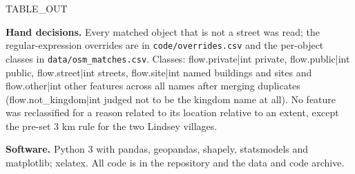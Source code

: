 \documentclass[11pt,a4paper]{article}
\begin{document}
{{TABLE_OUT}}

\textbf{Hand decisions.} Every matched object that is not a street was read; the regular-expression overrides are in \texttt{code/overrides.csv} and the per-object classes in \texttt{data/osm\_matches.csv}. Classes: {{flow.private|int}} private, {{flow.public|int}} public, {{flow.street|int}} streets, {{flow.site|int}} named buildings and sites and {{flow.other|int}} other features across all names after merging duplicates ({{flow.not_kingdom|int}} judged not to be the kingdom name at all). No feature was reclassified for a reason related to its location relative to an extent, except the pre-set 3 km rule for the two Lindsey villages.

\textbf{Software.} Python 3 with pandas, geopandas, shapely, statsmodels and matplotlib; xelatex. All code is in the repository and the data and code archive.
\end{document}
